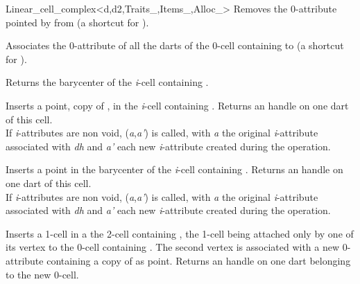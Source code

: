 \begin{ccRefClass}{Linear_cell_complex<d,d2,Traits_,Items_,Alloc_>}
{Removes the 0-attribute pointed by  from 
  (a shortcut for ).
}

{Associates the 0-attribute of all the darts of the 0-cell 
  containing  to 
  (a shortcut for ).
}


{Returns the barycenter of the \emph{i}-cell containing .
}

{Inserts a point, copy of , in the \emph{i}-cell containing .
  Returns an handle on one dart of this cell.  
  \\
    If \emph{i}-attributes are non void, 
    (\emph{a},\emph{a'}) is called, 
    with \emph{a} the original \emph{i}-attribute associated
    with \emph{dh} and \emph{a'} each new \emph{i}-attribute created during the operation.
}

{Inserts a point in the barycenter of the \emph{i}-cell containing .
  Returns an handle on one dart of this cell.  
  \\
    If \emph{i}-attributes are non void, 
    (\emph{a},\emph{a'}) is called,
    with \emph{a} the original \emph{i}-attribute associated
    with \emph{dh} and \emph{a'} each new \emph{i}-attribute created during the operation.
}

{Inserts a 1-cell in a the 2-cell containing , the 1-cell
  being attached only by one of its vertex to the 0-cell containing .
  The second vertex is associated with a new 0-attribute containing a copy of
   as point. Returns an handle on one dart belonging to the new 0-cell.
}


\end{ccRefClass}
